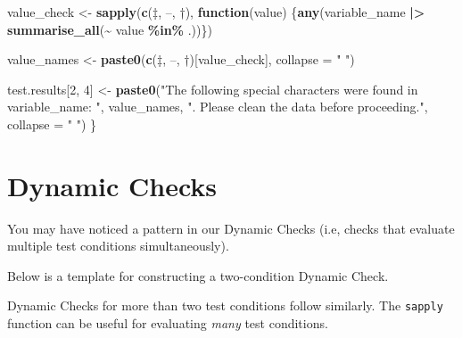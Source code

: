\documentclass[
  12pt,
]{book}
\newenvironment{Shaded}{\begin{snugshade}}{\end{snugshade}}
\newcommand{\AttributeTok}[1]{\textcolor[rgb]{0.13,0.29,0.53}{#1}}
\newcommand{\ControlFlowTok}[1]{\textcolor[rgb]{0.13,0.29,0.53}{\textbf{#1}}}
\newcommand{\DecValTok}[1]{\textcolor[rgb]{0.00,0.00,0.81}{#1}}
\newcommand{\FunctionTok}[1]{\textcolor[rgb]{0.13,0.29,0.53}{\textbf{#1}}}
\newcommand{\NormalTok}[1]{#1}
\newcommand{\OtherTok}[1]{\textcolor[rgb]{0.56,0.35,0.01}{#1}}
\newcommand{\SpecialCharTok}[1]{\textcolor[rgb]{0.81,0.36,0.00}{\textbf{#1}}}
\newcommand{\StringTok}[1]{\textcolor[rgb]{0.31,0.60,0.02}{#1}}
\begin{document}
\begin{Shaded}
\begin{Highlighting}[]
\NormalTok{  value\_check }\OtherTok{\textless{}{-}} \FunctionTok{sapply}\NormalTok{(}\FunctionTok{c}\NormalTok{(}\StringTok{\textquotesingle{}‡\textquotesingle{}}\NormalTok{, }\StringTok{\textquotesingle{}–\textquotesingle{}}\NormalTok{, }\StringTok{\textquotesingle{}†\textquotesingle{}}\NormalTok{), }\ControlFlowTok{function}\NormalTok{(value) \{}\FunctionTok{any}\NormalTok{(variable\_name }\SpecialCharTok{|\textgreater{}} \FunctionTok{summarise\_all}\NormalTok{(}\SpecialCharTok{\textasciitilde{}}\NormalTok{ value }\SpecialCharTok{\%in\%}\NormalTok{ .))\})}
    
\NormalTok{  value\_names }\OtherTok{\textless{}{-}} \FunctionTok{paste0}\NormalTok{(}\FunctionTok{c}\NormalTok{(}\StringTok{\textquotesingle{}‡\textquotesingle{}}\NormalTok{, }\StringTok{\textquotesingle{}–\textquotesingle{}}\NormalTok{, }\StringTok{\textquotesingle{}†\textquotesingle{}}\NormalTok{)[value\_check], }\AttributeTok{collapse =} \StringTok{" "}\NormalTok{)}
    
\NormalTok{  test.results[}\DecValTok{2}\NormalTok{, }\DecValTok{4}\NormalTok{] }\OtherTok{\textless{}{-}} \FunctionTok{paste0}\NormalTok{(}\StringTok{"The following special characters were found in \textasciigrave{}variable\_name\textasciigrave{}: "}\NormalTok{, value\_names, }\StringTok{". Please clean the data before proceeding."}\NormalTok{, }\AttributeTok{collapse =} \StringTok{"  "}\NormalTok{)}
\NormalTok{\}}
\end{Highlighting}
\end{Shaded}

\section{Dynamic Checks}\label{dynamic-checks}

You may have noticed a pattern in our Dynamic Checks (i.e, checks that evaluate multiple test conditions simultaneously).

Below is a template for constructing a two-condition Dynamic Check.

Dynamic Checks for more than two test conditions follow similarly. The \texttt{sapply} function can be useful for evaluating \emph{many} test conditions.
\end{document}
